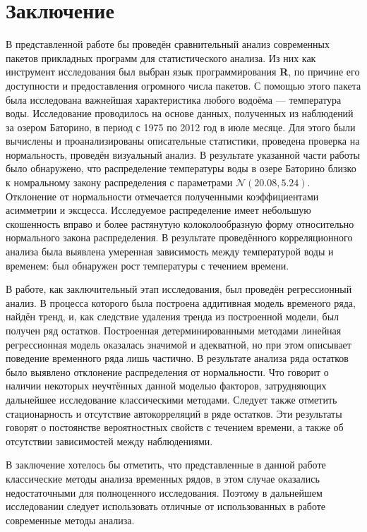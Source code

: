 \chapter*{Заключение}

В представленной работе бы проведён сравнительный анализ современных пакетов прикладных программ для статистического анализа. Из них как инструмент исследования был выбран язык программирования \textbf{R}, по причине его доступности и предоставления огромного числа пакетов. С помощью этого пакета была исследована важнейшая характеристика любого водоёма --- температура воды. Исследование проводилось на основе данных, полученных из наблюдений за озером Баторино, в период с 1975 по 2012 год в июле месяце. Для этого были вычислены и проанализированы описательные статистики, проведена проверка на нормальность, проведён визуальный анализ. В результате указанной части работы было обнаружено, что распределение температуры воды в озере Баторино близко к номральному закону распределения с параметрами $\mathcal{N}(20.08, 5.24)$. Отклонение от нормальности отмечается полученными коэффициентами асимметрии и эксцесса. Исследуемое распределение имеет небольшую скошенность вправо и более растянутую колоколообразную форму относительно нормального закона распределения. В результате проведённого корреляционного анализа была выявлена умеренная зависимость между температурой воды и временем: был обнаружен рост температуры с течением времени.

В работе, как заключительный этап исследования, был проведён регрессионный анализ. В процесса которого была построена аддитивная модель временого ряда, найдён тренд, и, как следствие удаления тренда из построенной модели, был получен ряд остатков. Построенная детерминированными методами линейная регрессионная модель оказалась значимой и адекватной, но при этом описывает поведение временного ряда лишь частично. В результате анализа ряда остатков было выявлено отклонение распределения от нормальности. Что говорит о наличии некоторых неучтённых данной моделью факторов, затрудняющих дальнейшее исследование классическими методами. Следует также отметить стационарность и отсутствие автокорреляций в ряде остатков. Эти результаты говорят о постоянстве вероятностных свойств с течением времени, а также об отсутствии зависимостей между наблюдениями.

В заключение хотелось бы отметить, что представленные в данной работе классические методы анализа временных рядов, в этом случае оказались недостаточными для полноценного исследования. Поэтому в дальнейшем исследовании следует использовать отличные от использованных в работе современные методы анализа.